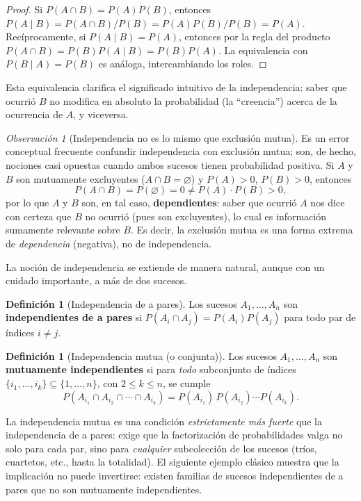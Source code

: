 \documentclass[11pt,a4paper]{article}
\theoremstyle{plain}
\theoremstyle{definition}
\newtheorem{definicion}[teorema]{Definición}
\theoremstyle{remark}
\newtheorem{observacion}[teorema]{Observación}
\begin{document}
\begin{proof}
Si $P(A\cap B)=P(A)P(B)$, entonces $P(A\mid B) = P(A\cap B)/P(B) = P(A)P(B)/P(B) = P(A)$. Recíprocamente, si $P(A\mid B)=P(A)$, entonces por la regla del producto $P(A\cap B) = P(B)P(A\mid B) = P(B)P(A)$. La equivalencia con $P(B\mid A)=P(B)$ es análoga, intercambiando los roles.
\end{proof}

Esta equivalencia clarifica el significado intuitivo de la independencia: saber que ocurrió $B$ no modifica en absoluto la probabilidad (la ``creencia'') acerca de la ocurrencia de $A$, y viceversa.

\begin{observacion}[Independencia no es lo mismo que exclusión mutua]
Es un error conceptual frecuente confundir independencia con exclusión mutua; son, de hecho, nociones casi opuestas cuando ambos sucesos tienen probabilidad positiva. Si $A$ y $B$ son mutuamente excluyentes ($A\cap B=\varnothing$) y $P(A)>0$, $P(B)>0$, entonces
\[
P(A\cap B) = P(\varnothing) = 0 \neq P(A)\cdot P(B) > 0,
\]
por lo que $A$ y $B$ son, en tal caso, \textbf{dependientes}: saber que ocurrió $A$ nos dice con certeza que $B$ no ocurrió (pues son excluyentes), lo cual es información sumamente relevante sobre $B$. Es decir, la exclusión mutua es una forma extrema de \emph{dependencia} (negativa), no de independencia.
\end{observacion}

La noción de independencia se extiende de manera natural, aunque con un cuidado importante, a más de dos sucesos.

\begin{definicion}[Independencia de a pares]
Los sucesos $A_1,\dots,A_n$ son \textbf{independientes de a pares} si $P(A_i\cap A_j)=P(A_i)P(A_j)$ para todo par de índices $i\neq j$.
\end{definicion}

\begin{definicion}[Independencia mutua (o conjunta)]
Los sucesos $A_1,\dots,A_n$ son \textbf{mutuamente independientes} si para \emph{todo} subconjunto de índices $\{i_1,\dots,i_k\}\subseteq\{1,\dots,n\}$, con $2\leq k\leq n$, se cumple
\[
P(A_{i_1}\cap A_{i_2}\cap \cdots \cap A_{i_k}) = P(A_{i_1})\,P(A_{i_2})\cdots P(A_{i_k}).
\]
\end{definicion}

La independencia mutua es una condición \emph{estrictamente más fuerte} que la independencia de a pares: exige que la factorización de probabilidades valga no solo para cada par, sino para \emph{cualquier} subcolección de los sucesos (tríos, cuartetos, etc., hasta la totalidad). El siguiente ejemplo clásico muestra que la implicación no puede invertirse: existen familias de sucesos independientes de a pares que no son mutuamente independientes.
\end{document}

